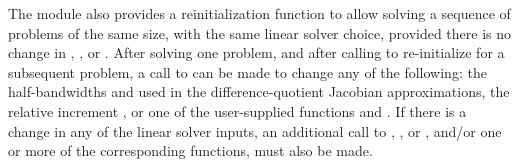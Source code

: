 The {\cvbbdpre} module also provides a reinitialization function to allow
solving a sequence of problems of the same size, with the same linear solver
choice, provided there is no change in , , or .
After solving one problem, and after calling  to
re-initialize {\cvodes} for a subsequent problem, a call to 
can be made to change any of the following: the half-bandwidths  and
 used in the difference-quotient Jacobian approximations, the relative
increment , or one of the user-supplied functions  and .
If there is a change in any of the linear solver inputs, an additional call
to , , or , and/or one or more of
the corresponding  functions, must also be made.

